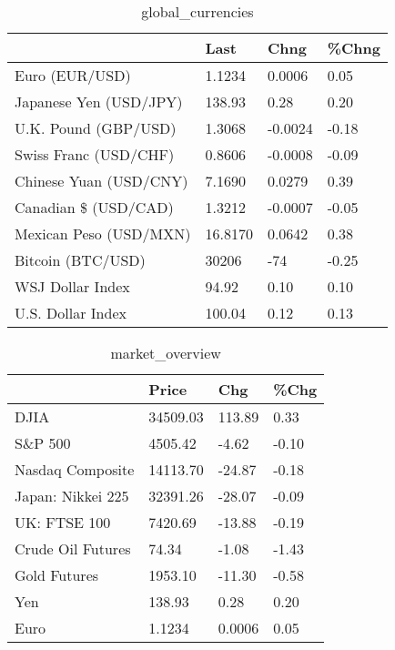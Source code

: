 \documentclass{article}%
\begin{document}
%


\begin{table}[htbp]%
\caption{global\_currencies}%
\centering%
\begin{adjustbox}{width=1\textwidth}%
\begin{tabular}{llll}
\toprule
                       &    Last &    Chng & \%Chng \\
\midrule
        Euro (EUR/USD) &  1.1234 &  0.0006 &  0.05 \\
Japanese Yen (USD/JPY) &  138.93 &    0.28 &  0.20 \\
  U.K. Pound (GBP/USD) &  1.3068 & -0.0024 & -0.18 \\
 Swiss Franc (USD/CHF) &  0.8606 & -0.0008 & -0.09 \\
Chinese Yuan (USD/CNY) &  7.1690 &  0.0279 &  0.39 \\
  Canadian \$ (USD/CAD) &  1.3212 & -0.0007 & -0.05 \\
Mexican Peso (USD/MXN) & 16.8170 &  0.0642 &  0.38 \\
     Bitcoin (BTC/USD) &   30206 &     -74 & -0.25 \\
      WSJ Dollar Index &   94.92 &    0.10 &  0.10 \\
     U.S. Dollar Index &  100.04 &    0.12 &  0.13 \\
\bottomrule
\end{tabular}
%
\end{adjustbox}%
\end{table}

%


\begin{table}[htbp]%
\caption{market\_overview}%
\centering%
\begin{adjustbox}{width=1\textwidth}%
\begin{tabular}{llll}
\toprule
                  &    Price &    Chg &  \%Chg \\
\midrule
             DJIA & 34509.03 & 113.89 &  0.33 \\
          S\&P 500 &  4505.42 &  -4.62 & -0.10 \\
 Nasdaq Composite & 14113.70 & -24.87 & -0.18 \\
Japan: Nikkei 225 & 32391.26 & -28.07 & -0.09 \\
     UK: FTSE 100 &  7420.69 & -13.88 & -0.19 \\
Crude Oil Futures &    74.34 &  -1.08 & -1.43 \\
     Gold Futures &  1953.10 & -11.30 & -0.58 \\
              Yen &   138.93 &   0.28 &  0.20 \\
             Euro &   1.1234 & 0.0006 &  0.05 \\
\bottomrule
\end{tabular}
%
\end{adjustbox}%
\end{table}

%
\end{document}
